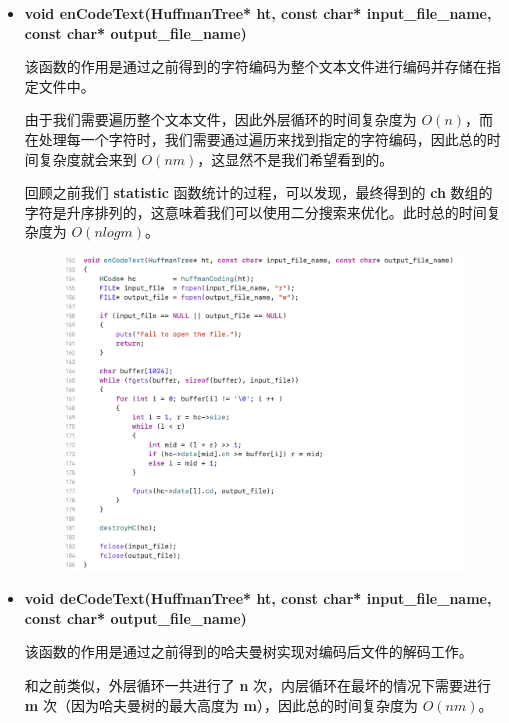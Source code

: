 \begin{itemize}
\begin{figure}[htbp]
                    \end{figure}
                \item \textbf{void enCodeText(HuffmanTree* ht, const char* input\_file\_name, const char* output\_file\_name)}
                    \par 该函数的作用是通过之前得到的字符编码为整个文本文件进行编码并存储在指定文件中。
                    \par 由于我们需要遍历整个文本文件，因此外层循环的时间复杂度为 $O(n)$，而在处理每一个字符时，我们需要通过遍历来找到指定的字符编码，因此总的时间复杂度就会来到 $O(nm)$，这显然不是我们希望看到的。
                    \par 回顾之前我们 \textbf{statistic} 函数统计的过程，可以发现，最终得到的 \textbf{ch} 数组的字符是升序排列的，这意味着我们可以使用二分搜索来优化。此时总的时间复杂度为 $O(nlogm)$。
                    \begin{figure}[htbp]
                        \hspace*{1.2cm}
                        \includegraphics*[width = 12cm]{s1_4.png}
                    \end{figure}
                \newpage
                \item \textbf{void deCodeText(HuffmanTree* ht, const char* input\_file\_name, const char* output\_file\_name)}
                    \par 该函数的作用是通过之前得到的哈夫曼树实现对编码后文件的解码工作。
                    \par 和之前类似，外层循环一共进行了 \textbf{n} 次，内层循环在最坏的情况下需要进行 \textbf{m} 次（因为哈夫曼树的最大高度为 \textbf{m}），因此总的时间复杂度为 $O(nm)$。

\end{itemize}
